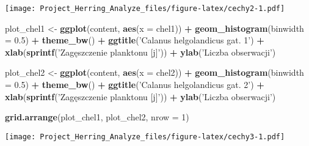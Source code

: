 \documentclass[]{article}
\newenvironment{Shaded}{\begin{snugshade}}{\end{snugshade}}
\newcommand{\DataTypeTok}[1]{\textcolor[rgb]{0.13,0.29,0.53}{#1}}
\newcommand{\DecValTok}[1]{\textcolor[rgb]{0.00,0.00,0.81}{#1}}
\newcommand{\FloatTok}[1]{\textcolor[rgb]{0.00,0.00,0.81}{#1}}
\newcommand{\KeywordTok}[1]{\textcolor[rgb]{0.13,0.29,0.53}{\textbf{#1}}}
\newcommand{\NormalTok}[1]{#1}
\newcommand{\OperatorTok}[1]{\textcolor[rgb]{0.81,0.36,0.00}{\textbf{#1}}}
\newcommand{\StringTok}[1]{\textcolor[rgb]{0.31,0.60,0.02}{#1}}
\begin{document}
\texttt{[image: Project\_Herring\_Analyze\_files/figure-latex/cechy2-1.pdf]}

\begin{Shaded}
\begin{Highlighting}[]
\NormalTok{plot_chel1 <-}\StringTok{ }\KeywordTok{ggplot}\NormalTok{(content, }\KeywordTok{aes}\NormalTok{(}\DataTypeTok{x =}\NormalTok{ chel1)) }\OperatorTok{+}\StringTok{ }\KeywordTok{geom_histogram}\NormalTok{(}\DataTypeTok{binwidth =} \FloatTok{0.5}\NormalTok{) }\OperatorTok{+}
\StringTok{  }\KeywordTok{theme_bw}\NormalTok{() }\OperatorTok{+}\StringTok{ }\KeywordTok{ggtitle}\NormalTok{(}\StringTok{'Calanus helgolandicus gat. 1'}\NormalTok{) }\OperatorTok{+}\StringTok{ }
\StringTok{  }\KeywordTok{xlab}\NormalTok{(}\KeywordTok{sprintf}\NormalTok{(}\StringTok{'Zagęszczenie planktonu [j]'}\NormalTok{)) }\OperatorTok{+}\StringTok{ }\KeywordTok{ylab}\NormalTok{(}\StringTok{'Liczba obserwacji'}\NormalTok{)}

\NormalTok{plot_chel2 <-}\StringTok{ }\KeywordTok{ggplot}\NormalTok{(content, }\KeywordTok{aes}\NormalTok{(}\DataTypeTok{x =}\NormalTok{ chel2)) }\OperatorTok{+}\StringTok{ }\KeywordTok{geom_histogram}\NormalTok{(}\DataTypeTok{binwidth =} \FloatTok{0.5}\NormalTok{) }\OperatorTok{+}
\StringTok{  }\KeywordTok{theme_bw}\NormalTok{() }\OperatorTok{+}\StringTok{ }\KeywordTok{ggtitle}\NormalTok{(}\StringTok{'Calanus helgolandicus gat. 2'}\NormalTok{) }\OperatorTok{+}\StringTok{ }
\StringTok{  }\KeywordTok{xlab}\NormalTok{(}\KeywordTok{sprintf}\NormalTok{(}\StringTok{'Zagęszczenie planktonu [j]'}\NormalTok{)) }\OperatorTok{+}\StringTok{ }\KeywordTok{ylab}\NormalTok{(}\StringTok{'Liczba obserwacji'}\NormalTok{)}

\KeywordTok{grid.arrange}\NormalTok{(plot_chel1, plot_chel2, }\DataTypeTok{nrow =} \DecValTok{1}\NormalTok{)}
\end{Highlighting}
\end{Shaded}

\texttt{[image: Project\_Herring\_Analyze\_files/figure-latex/cechy3-1.pdf]}
\end{document}
